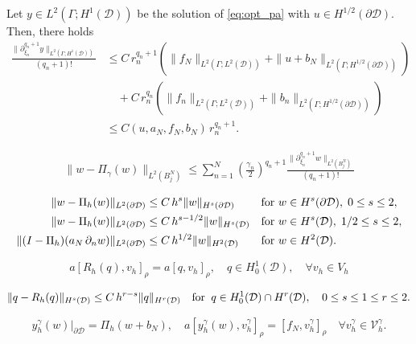 \documentclass[10pt,a4paper]{amsart}
\newcommand{\cD}{{\mathcal{D}}}
\begin{document}
\begin{corollary}
  \label{cor:state_regularity_wrt_stochastic}
  Let $y\in L^2(\Gamma;H^1(\cD))$ be the solution of \eqref{eq:opt_pa} with $u\in H^{1/2}(\partial\cD)$. Then, there holds
  \begin{align*}
    \frac{\|\partial_{\xi_n}^{q_n+1} y\|_{L^2(\Gamma; H^1(\cD))}}{(q_n+1)!}
    &\le C\,r_n^{q_n+1}\left(\|f_N\|_{L^2(\Gamma; L^2(\cD))} + \|u+b_N\|_{L^2(\Gamma; H^{1/2}(\partial\cD))}\right) \\
    &\quad + C\,r_n^{q_n}\left(\|f_n\|_{L^2(\Gamma; L^2(\cD))} + \|b_n\|_{L^2(\Gamma; H^{1/2}(\partial\cD))}\right) \\
    &\le C(u,a_N,f_N,b_N)\,r_n^{q_n+1}.
  \end{align*}
\end{corollary}

\begin{eqnarray}\label{est:parametric}
  \|w - \Pi_\gamma(w)\|_{L^2(B_j^N)} \leq
  \sum_{n=1}^N \left(\frac{\gamma_n}{2}\right)^{q_n+1} \frac{\|\partial_{\xi_n}^{q_n+1} w\|_{L^2(B_j^N)}}{(q_n+1)!}
\end{eqnarray}

    \begin{align}
        \|w -\Pi_h(w)\|_{L^2(\partial \cD)} &\leq C \, h^{s} \|w\|_{H^s(\partial \cD)} && \hbox{for}\ w \in H^s(\partial \cD), \; 0 \leq s \leq 2, \label{ineq:l2_projectiona} \\
        \|w -\Pi_h(w)\|_{L^2(\partial \cD)} &\leq C \, h^{s-1/2} \|w\|_{H^s(\cD)} && \hbox{for}\ w \in H^s(\cD), \; 1/2 \leq s \leq 2, \label{ineq:l2_projectionb} \\ 
        \|(I - \Pi_h)(a_N\,\partial_n w) \|_{L^2(\partial \cD)} &\leq C \, h^{1/2} \|w\|_{H^2(\cD)} && \hbox{for}\ w \in H^2(\cD).  \label{ineq:l2_projectionc}
    \end{align}

\begin{equation}\label{ritz_def}
 a[R_h(q), v_h]_{\rho} = a[q, v_h]_{\rho}, \quad  q \in H^1_0(\cD), \quad \forall   v_h \in V_h
\end{equation}

\begin{equation}\label{ritz_ineq}
 \| q -R_h(q)\|_{H^s(\cD)} \leq C \, h^{r -s} \|q\|_{H^r(\cD)} \quad  \hbox{for} \;\; q \in H^1_0(\cD) \cap H^r(\cD), \quad  0 \leq s \leq 1 \leq r \leq 2.
\end{equation}

\begin{equation}\label{eqn:aux2}
  y_h^{\gamma}(w) |_{\partial\cD}= \Pi_{h}(w+b_{N}),\quad a[y_h^{\gamma}(w), v_h^\gamma]_{\rho} = [f_N,v_h^\gamma]_{\rho} \quad \forall v_h^\gamma \in \mathcal{V}_h^{\gamma}.
\end{equation}
\end{document}
